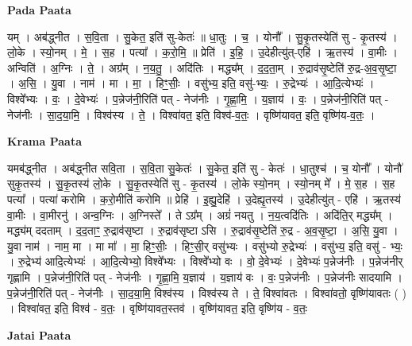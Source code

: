\documentclass[17pt]{extarticle}
\begin{document}
\textbf{Pada Paata} \newline

यम् । अब॑द्ध्नीत । स॒वि॒ता । सु॒केत॒ इति॑ सु-केतः॑ ॥ धा॒तुः । च॒ । योनौ᳚ । सु॒कृ॒तस्येति॑ सु - कृ॒तस्य॑ । लो॒के । स्यो॒नम् । मे॒ । स॒ह । पत्या᳚ । क॒रो॒मि॒ ॥ प्रेति॑ । इ॒हि॒ । उ॒देहीत्यु॑त्-एहि॑ । ऋ॒तस्य॑ । वा॒मीः । अन्विति॑ । अ॒ग्निः । ते॒ । अग्र᳚म् । न॒य॒तु॒ । अदि॑तिः । मद्ध्य᳚म् । द॒द॒ता॒म् । रु॒द्राव॑सृ॒ष्टेति॑ रु॒द्र-अ॒व॒सृ॒ष्टा॒ । अ॒सि॒ । यु॒वा । नाम॑ । मा । मा॒ । हिꣳ॒॒सीः॒ । वसु॑भ्य॒ इति॒ वसु॑-भ्यः॒ । रु॒द्रेभ्यः॑ । आ॒दि॒त्येभ्यः॑ । विश्वे᳚भ्यः । वः॒ । दे॒वेभ्यः॑ । प॒न्नेज॑नी॒रिति॑ पत् - नेज॑नीः । गृ॒ह्णा॒मि॒ । य॒ज्ञाय॑ । वः॒ । प॒न्नेज॑नी॒रिति॑ पत् - नेज॑नीः । सा॒द॒या॒मि॒ । विश्व॑स्य । ते॒ । विश्वा॑वत॒ इति॒ विश्व॑-व॒तः॒ । वृष्णि॑यावत॒ इति॒ वृष्णि॑य-व॒तः॒ ।  \newline


\textbf{Krama Paata} \newline

यमब॑द्ध्नीत । अब॑द्ध्नीत सवि॒ता । स॒वि॒ता सु॒केतः॑ । सु॒केत॒ इति॑ सु - केतः॑ । धा॒तुश्च॑ । च॒ योनौ᳚ । योनौ॑ सुकृ॒तस्य॑ । सु॒कृ॒तस्य॑ लो॒के । सु॒कृ॒तस्येति॑ सु - कृ॒तस्य॑ । लो॒के स्यो॒नम् । स्यो॒नम् मे᳚ । मे॒ स॒ह । स॒ह पत्या᳚ । पत्या॑ करोमि । क॒रो॒मीति॑ करोमि ॥ प्रेहि॑ । इ॒ह्यु॒देहि॑ । उ॒देह्यृ॒तस्य॑ । उ॒देहीत्यु॑त् - एहि॑ । ऋ॒तस्य॑ वा॒मीः । वा॒मीरनु॑ । अन्व॒ग्निः । अ॒ग्निस्ते᳚ । ते ऽग्र᳚म् । अग्रं॑ नयतु । न॒य॒त्वदि॑तिः । अदि॑ति॒र् मद्ध्य᳚म् । मद्ध्य॑म् ददताम् । द॒द॒ताꣳ॒॒ रु॒द्राव॑सृष्टा । रु॒द्राव॑सृष्टा ऽसि । रु॒द्राव॑सृ॒ष्टेति॑ रु॒द्र - अ॒व॒सृ॒ष्टा॒ । अ॒सि॒ यु॒वा । यु॒वा नाम॑ । नाम॒ मा । मा मा᳚ । मा॒ हिꣳ॒॒सीः॒ । हिꣳ॒॒सी॒र् वसु॑भ्यः । वसु॑भ्यो रु॒द्रेभ्यः॑ । वसु॑भ्य॒ इति॒ वसु॑ - भ्यः॒ । रु॒द्रेभ्य॑ आदि॒त्येभ्यः॑ । आ॒दि॒त्येभ्यो॒ विश्वे᳚भ्यः । विश्वे᳚भ्यो वः । वो॒ दे॒वेभ्यः॑ । दे॒वेभ्यः॑ प॒न्नेज॑नीः । प॒न्नेज॑नीर् गृह्णामि । प॒न्नेज॑नी॒रिति॑ पत् - नेज॑नीः । गृ॒ह्णा॒मि॒ य॒ज्ञाय॑ । य॒ज्ञाय॑ वः । वः॒ प॒न्नेज॑नीः । प॒न्नेज॑नीः सादयामि । प॒न्नेज॑नी॒रिति॑ पत् - नेज॑नीः । सा॒द॒या॒मि॒ विश्व॑स्य । विश्व॑स्य ते । ते॒ विश्वा॑वतः । विश्वा॑वतो॒ वृष्णि॑यावतः ( ) । विश्वा॑वत॒ इति॒ विश्व॑ - व॒तः॒ । वृष्णि॑यावत॒स्तव॑ । वृष्णि॑यावत॒ इति॒ वृष्णि॑य - व॒तः॒ \newline

\textbf{Jatai Paata} \newline
\end{document}
